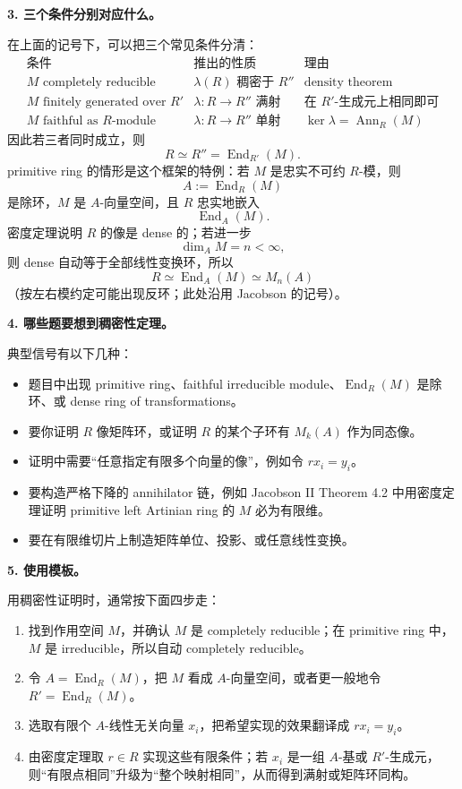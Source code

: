 \documentclass[a4paper]{ctexart}
\theoremstyle{definition}
\theoremstyle{analysis}
\theoremstyle{plain}
\begin{document}
\medskip

\textbf{3. 三个条件分别对应什么。}

在上面的记号下，可以把三个常见条件分清：
\[
\begin{array}{c|c|c}
\text{条件} & \text{推出的性质} & \text{理由} \\
\hline
M\text{ completely reducible} & \lambda(R)\text{ 稠密于 }R'' &
\text{density theorem} \\
M\text{ finitely generated over }R' & \lambda:R\to R''\text{ 满射} &
\text{在 }R'\text{-生成元上相同即可} \\
M\text{ faithful as }R\text{-module} & \lambda:R\to R''\text{ 单射} &
\ker\lambda=\operatorname{Ann}_R(M)
\end{array}
\]
因此若三者同时成立，则
\[
  R\simeq R''=\operatorname{End}_{R'}(M).
\]
primitive ring 的情形是这个框架的特例：若 \(M\) 是忠实不可约 \(R\)-模，则
\[
  A:=\operatorname{End}_R(M)
\]
是除环，\(M\) 是 \(A\)-向量空间，且 \(R\) 忠实地嵌入
\[
  \operatorname{End}_A(M).
\]
密度定理说明 \(R\) 的像是 dense 的；若进一步
\[
  \dim_A M=n<\infty,
\]
则 dense 自动等于全部线性变换环，所以
\[
  R\simeq \operatorname{End}_A(M)\simeq M_n(A)
\]
（按左右模约定可能出现反环；此处沿用 Jacobson 的记号）。

\medskip

\textbf{4. 哪些题要想到稠密性定理。}

典型信号有以下几种：
\begin{itemize}
  \item 题目中出现 primitive ring、faithful irreducible module、\(\operatorname{End}_R(M)\) 是除环、或 dense ring of transformations。
  \item 要你证明 \(R\) 像矩阵环，或证明 \(R\) 的某个子环有 \(M_k(A)\) 作为同态像。
  \item 证明中需要“任意指定有限多个向量的像”，例如令 \(rx_i=y_i\)。
  \item 要构造严格下降的 annihilator 链，例如 Jacobson II Theorem 4.2 中用密度定理证明 primitive left Artinian ring 的 \(M\) 必为有限维。
  \item 要在有限维切片上制造矩阵单位、投影、或任意线性变换。
\end{itemize}

\medskip

\textbf{5. 使用模板。}

用稠密性证明时，通常按下面四步走：
\begin{enumerate}
  \item 找到作用空间 \(M\)，并确认 \(M\) 是 completely reducible；在 primitive ring 中，\(M\) 是 irreducible，所以自动 completely reducible。
  \item 令 \(A=\operatorname{End}_R(M)\)，把 \(M\) 看成 \(A\)-向量空间，或者更一般地令 \(R'=\operatorname{End}_R(M)\)。
  \item 选取有限个 \(A\)-线性无关向量 \(x_i\)，把希望实现的效果翻译成 \(rx_i=y_i\)。
  \item 由密度定理取 \(r\in R\) 实现这些有限条件；若 \(x_i\) 是一组 \(A\)-基或 \(R'\)-生成元，则“有限点相同”升级为“整个映射相同”，从而得到满射或矩阵环同构。
\end{enumerate}
\end{document}
